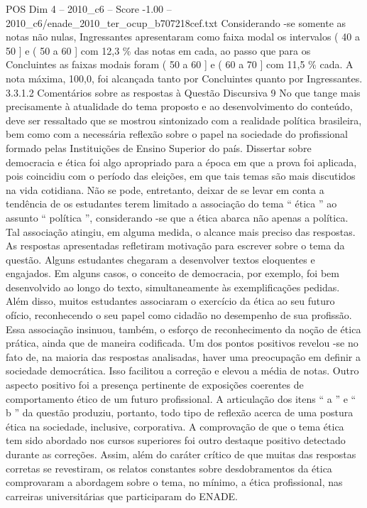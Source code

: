 \begin{textsample}{POS Dim 4 – 2010\_c6 – Score -1.00 – 2010\_c6/enade\_2010\_ter\_ocup\_b707218cef.txt}
Considerando -se somente as notas não nulas, Ingressantes apresentaram como faixa modal os intervalos ( 40 a 50 ] e ( 50 a 60 ] com 12,3 \% das notas em cada, ao passo que para os Concluintes as faixas modais foram ( 50 a 60 ] e ( 60 a 70 ] com 11,5 \% cada.
A nota máxima, 100,0, foi alcançada tanto por Concluintes quanto por Ingressantes. 3.3.1.2 Comentários sobre as respostas à Questão Discursiva 9 No que tange mais precisamente à atualidade do tema proposto e ao desenvolvimento do conteúdo, deve ser ressaltado que se mostrou sintonizado com a realidade política brasileira, bem como com a necessária reflexão sobre o papel na sociedade do profissional formado pelas Instituições de Ensino Superior do país.
Dissertar sobre democracia e ética foi algo apropriado para a época em que a prova foi aplicada, pois coincidiu com o período das eleições, em que tais temas são mais discutidos na vida cotidiana.
Não se pode, entretanto, deixar de se levar em conta a tendência de os estudantes terem limitado a associação do tema “ ética ” ao assunto “ política ”, considerando -se que a ética abarca não apenas a política.
Tal associação atingiu, em alguma medida, o alcance mais preciso das respostas.
As respostas apresentadas refletiram motivação para escrever sobre o tema da questão.
Alguns estudantes chegaram a desenvolver textos eloquentes e engajados.
Em alguns casos, o conceito de democracia, por exemplo, foi bem desenvolvido ao longo do texto, simultaneamente às exemplificações pedidas.
Além disso, muitos estudantes associaram o exercício da ética ao seu futuro ofício, reconhecendo o seu papel como cidadão no desempenho de sua profissão.
Essa associação insinuou, também, o esforço de reconhecimento da noção de ética prática, ainda que de maneira codificada.
Um dos pontos positivos revelou -se no fato de, na maioria das respostas analisadas, haver uma preocupação em definir a sociedade democrática.
Isso facilitou a correção e elevou a média de notas.
Outro aspecto positivo foi a presença pertinente de exposições coerentes de comportamento ético de um futuro profissional.
A articulação dos itens “ a ” e “ b ” da questão produziu, portanto, todo tipo de reflexão acerca de uma postura ética na sociedade, inclusive, corporativa.
A comprovação de que o tema ética tem sido abordado nos cursos superiores foi outro destaque positivo detectado durante as correções.
Assim, além do caráter crítico de que muitas das respostas corretas se revestiram, os relatos constantes sobre desdobramentos da ética comprovaram a abordagem sobre o tema, no mínimo, a ética profissional, nas carreiras universitárias que participaram do ENADE.

\end{textsample}
